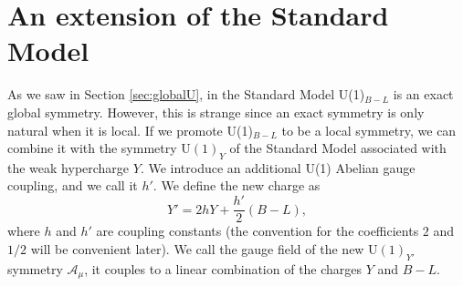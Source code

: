 

\section{An extension of the Standard Model}
As we saw in Section \ref{sec:globalU}, in the Standard Model U(1)$_{B-L}$ is an exact global symmetry. However, this is strange since an exact symmetry is only natural when it is local. If we promote U(1)$_{B-L}$ to be a local symmetry, we can combine it with the symmetry U$(1)_Y$ of the Standard Model associated with the weak hypercharge $Y$. We introduce an additional U(1) Abelian gauge coupling, and we call it $h'$. We define the new charge as
\begin{equation}
	Y' = 2hY + \frac{h'}{2}(B-L),
\end{equation}
where $h$ and $h'$ are coupling constants (the convention for the coefficients $2$ and $1/2$ will be convenient later). We call the gauge field of the new U$(1)_{Y'}$ symmetry $\mathcal{A}_{\mu}$, it couples to a linear combination of the charges $Y$ and $B-L$.
 
